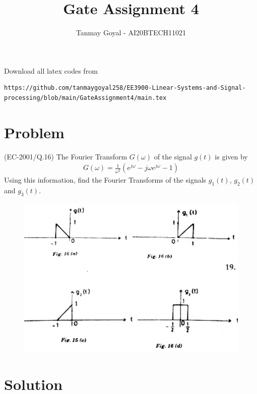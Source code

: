 \documentclass[journal,12pt,twocolumn]{IEEEtran}
\begin{document}
\def\putbox#1#2#3{\makebox[0in][l]{\makebox[#1][l]{}\raisebox{\baselineskip}[0in][0in]{\raisebox{#2}[0in][0in]{#3}}}}
     \def\rightbox#1{\makebox[0in][r]{#1}}
     \def\centbox#1{\makebox[0in]{#1}}
     \def\topbox#1{\raisebox{-\baselineskip}[0in][0in]{#1}}
     \def\midbox#1{\raisebox{-0.5\baselineskip}[0in][0in]{#1}}
\vspace{3cm}
\title{Gate Assignment 4}
\author{Tanmay Goyal - AI20BTECH11021}
\maketitle
\newpage
\bigskip
\renewcommand{\thefigure}{\theenumi}
\renewcommand{\thetable}{\theenumi}

Download all latex codes from 
\begin{lstlisting}
https://github.com/tanmaygoyal258/EE3900-Linear-Systems-and-Signal-processing/blob/main/GateAssignment4/main.tex
\end{lstlisting}
\section{Problem}
(EC-2001/Q.16) The Fourier Transform $G(\omega)$ of the signal $g(t)$ is given by 
\begin{align}
    G(\omega) = \frac{1}{\omega^2}(e^{j\omega} - j\omega e^{j\omega} - 1)
\end{align}
Using this information, find the Fourier Transforms of the signals $g_1(t)$, $g_2(t)$ and $g_3(t)$.
\begin{figure}[!ht]
\centering
 \includegraphics[width=\columnwidth]{Question.png}
\end{figure}
\section{Solution}
\end{document}
